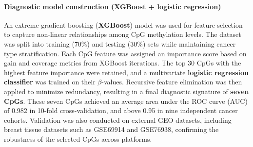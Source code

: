 \documentclass[10pt]{extarticle}
\begin{document}
\paragraph{Diagnostic model construction (XGBoost + logistic regression)}
An extreme gradient boosting (\textbf{XGBoost}) model was used for feature selection to capture non-linear relationships among CpG methylation levels. The dataset was split into training (70\%) and testing (30\%) sets while maintaining cancer type stratification. Each CpG feature was assigned an importance score based on gain and coverage metrics from XGBoost iterations.  
The top 30 CpGs with the highest feature importance were retained, and a multivariate \textbf{logistic regression classifier} was trained on their $\beta$-values. Recursive feature elimination was then applied to minimize redundancy, resulting in a final diagnostic signature of \textbf{seven CpGs}.  
These seven CpGs achieved an average area under the ROC curve (AUC) of 0.982 in 10-fold cross-validation, and above 0.95 in nine independent cancer cohorts. Validation was also conducted on external GEO datasets, including breast tissue datasets such as GSE69914 and GSE76938, confirming the robustness of the selected CpGs across platforms.
\end{document}
